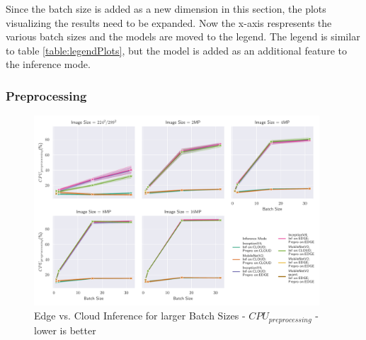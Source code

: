 Since the batch size is added as a new dimension in this section, the plots visualizing the results need to be expanded.
Now the x-axis respresents the various batch sizes and the models are moved to the legend. 
The legend is similar to table \ref{table:legendPlots}, but the model is added as an additional feature to the inference mode.
\subsubsection{Preprocessing}
\begin{figure}[!htb]
\centering
\includegraphics[width=0.95\textwidth]{./Bilder/single_plots/batch_size_plots/Effects_of_Batch_size_Preprocessing_CPU_Usage.pdf}
\caption{Edge vs. Cloud Inference for larger Batch Sizes -  $CPU_{preprocessing}$ - lower is better}
\label{fig:BatchSizePreproCPU}
\end{figure}

